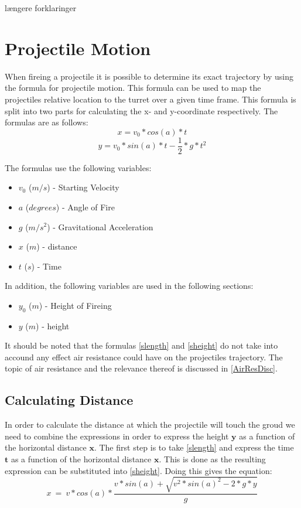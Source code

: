 længere forklaringer
\section{Projectile Motion}\label{ProjMotion}
When fireing a projectile it is possible to determine its exact trajectory by
using the formula for projectile motion. This formula can be used to map the
projectiles relative location to the turret over a given time frame. This
formula is split into two parts for calculating the x- and y-coordinate
respectively. The formulas are as follows:
\begin{equation}\label{slength}
x=v_0*cos(a)*t
\end{equation}
\begin{equation}\label{sheight}
y=v_0*sin(a)*t-\frac{1}{2}*g*t^2
\end{equation}

The formulas use the following variables:
\begin{itemize}
  \item $v_0$ ($m/s$) - Starting Velocity 
  \item $a$ ($degrees$) - Angle of Fire 
  \item $g$ ($m/s^2$) - Gravitational Acceleration 
  \item $x$ ($m$) - distance
  \item $t$ ($s$) - Time
\end{itemize}
In addition, the following variables are used in the following sections:
\begin{itemize}
  \item $y_0$ ($m$) - Height of Fireing 
  \item $y$ ($m$) - height
\end{itemize}

It should be noted that the formulas \autoref{slength} and \autoref{sheight} do
not take into accound any effect air resistance could have on the projectiles
trajectory. The topic of air resistance and the relevance thereof is discussed
in \autoref{AirResDisc}.

\subsection{Calculating Distance}
In order to calculate the distance at which the projectile will touch the groud
we need to combine the expressions in order to express the height $\textbf{y}$
as a function of the horizontal distance $\textbf{x}$. The first step is to take
\autoref{slength} and express the time $\textbf{t}$ as a function of the
horizontal distance $\textbf{x}$. This is done as the resulting expression can
be substituted into \autoref{sheight}. Doing this gives the equation:
\begin{equation}\label{FinEq}
x\ =\ v*cos(a)*\frac{v*sin(a)+\sqrt{v^2*sin(a)^2-2*g*y}}{g}
\end{equation}

